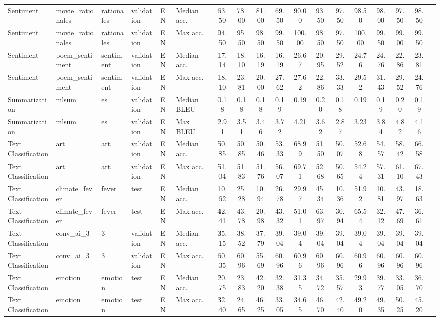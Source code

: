 \documentclass[11pt]{article}
\begin{document}
\begin{table*}[ht]
\begin{minipage}{\pdfpagewidth}
{\begin{tabular}{llllll|ccccc|ccccccc}
Sentiment & movie\_rationales & rationales & validation & EN & Median acc. & 63.50 & 78.00 & 81.00 & 69.50 & 90.00 & 93.50 & 97.50 & 98.50 & 98.00 & 97.50 & 98.50\\
Sentiment & movie\_rationales & rationales & validation & EN & Max acc. & 94.50 & 95.50 & 98.50 & 99.50 & 100.00 & 98.50 & 97.50 & 100.00 & 99.50 & 99.00 & 99.50\\
Sentiment & poem\_sentiment & sentiment & validation & EN & Median acc. & 17.14 & 18.10 & 16.19 & 16.19 & 26.67 & 20.95 & 29.52 & 24.76 & 24.76 & 22.86 & 23.81\\
Sentiment & poem\_sentiment & sentiment & validation & EN & Max acc. & 18.10 & 23.81 & 20.00 & 27.62 & 27.62 & 22.86 & 33.33 & 29.52 & 31.43 & 29.52 & 24.76\\
\midrule
Summarization & mlsum & es & validation & EN & Median BLEU & 0.18 & 0.18 & 0.18 & 0.19 & 0.19 & 0.20 & 0.18 & 0.19 & 0.19 & 0.20 & 0.19\\
Summarization & mlsum & es & validation & EN & Max BLEU & 2.91 & 3.51 & 3.46 & 3.72 & 4.21 & 3.62 & 2.87 & 3.23 & 3.84 & 4.82 & 4.16\\
\midrule
Text Classification & art & art & validation & EN & Median acc. & 50.85 & 50.85 & 50.46 & 53.33 & 68.99 & 51.50 & 50.07 & 52.68 & 54.57 & 58.42 & 66.58\\
Text Classification & art & art & validation & EN & Max acc. & 51.04 & 51.83 & 51.76 & 56.07 & 69.71 & 52.68 & 50.65 & 54.24 & 57.31 & 61.10 & 67.43\\
Text Classification & climate\_fever & fever & test & EN & Median acc. & 10.62 & 25.28 & 10.94 & 26.78 & 29.97 & 45.34 & 10.36 & 51.92 & 10.81 & 43.97 & 18.63\\
Text Classification & climate\_fever & fever & test & EN & Max acc. & 42.41 & 43.78 & 20.98 & 43.32 & 51.01 & 63.97 & 30.94 & 65.54 & 32.12 & 47.69 & 36.61\\
Text Classification & conv\_ai\_3 & 3 & validation & EN & Median acc. & 35.15 & 38.52 & 37.79 & 39.04 & 39.04 & 39.04 & 39.04 & 39.04 & 39.04 & 39.04 & 39.04\\
Text Classification & conv\_ai\_3 & 3 & validation & EN & Max acc. & 60.35 & 60.96 & 55.69 & 60.96 & 60.96 & 60.96 & 60.96 & 60.96 & 60.96 & 60.96 & 60.96\\
Text Classification & emotion & emotion & test & EN & Median acc. & 20.75 & 23.83 & 42.20 & 32.38 & 31.35 & 34.72 & 35.57 & 29.93 & 39.77 & 33.05 & 36.70\\
Text Classification & emotion & emotion & test & EN & Max acc. & 32.40 & 24.65 & 46.25 & 33.05 & 34.65 & 46.70 & 42.40 & 49.20 & 49.35 & 50.25 & 45.20\\

\end{tabular}}
\end{minipage}
\end{table*}
\end{document}
